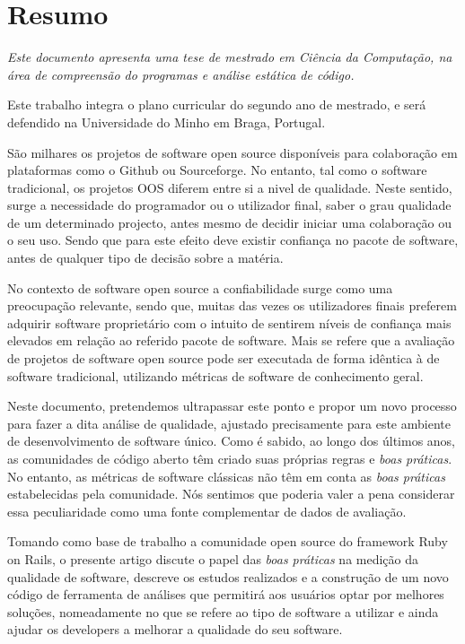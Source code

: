 \thispagestyle{plain}
\chapter*{Resumo}\label{chap:resumo}


{\it
  Este documento apresenta uma tese de mestrado em Ciência da Computação, 
  na área de \textit{compreensão do programas e análise estática de código}.

  Este trabalho integra o plano curricular do segundo ano de mestrado,
  e será defendido na Universidade do Minho em Braga, Portugal.

  São milhares os projetos de software open source disponíveis para colaboração em plataformas como o Github ou Sourceforge.
  No entanto, tal como o software tradicional, os projetos OOS diferem entre si a nivel de qualidade.
  Neste sentido, surge a necessidade do programador ou o utilizador final, saber o grau qualidade de um determinado projecto,
  antes mesmo de decidir iniciar uma colaboração ou o seu uso. 
  Sendo que para este efeito deve existir confiança no pacote de software, antes de qualquer tipo de decisão sobre a matéria.
   
  No contexto de software open source a confiabilidade surge como uma preocupação relevante, 
  sendo que, muitas das vezes os utilizadores finais preferem adquirir 
  software proprietário com o intuito de sentirem níveis de confiança mais elevados em relação ao referido pacote de software.
  Mais se refere que a avaliação de projetos de software open source pode ser executada de forma idêntica à de 
  software tradicional, utilizando métricas de software de conhecimento geral.
  
  Neste documento, pretendemos ultrapassar este ponto e propor um novo processo para fazer a dita análise de qualidade,
  ajustado precisamente para este ambiente de desenvolvimento de software único.
  Como é sabido, ao longo dos últimos anos, as comunidades de código aberto têm criado suas próprias regras e \emph{boas práticas}.
  No entanto, as métricas de software clássicas não têm em conta as \emph{boas práticas}
  estabelecidas pela comunidade.
  Nós sentimos que poderia valer a pena considerar essa peculiaridade como uma fonte complementar de dados de avaliação.
  
  Tomando como base de trabalho a comunidade open source do framework Ruby on Rails,
  o presente artigo discute o papel das
  \emph{boas práticas} na medição da qualidade de software, descreve os estudos realizados e
  a construção de um novo código de ferramenta de análises que
  permitirá aos usuários optar por melhores soluções, nomeadamente no que se refere ao tipo de software a utilizar e ainda 
  ajudar os developers a melhorar a qualidade do seu software.
}
